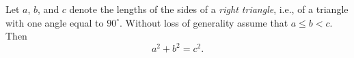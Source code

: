 \documentclass{article}
\begin{document}
\begin{frm-thm}[Pythagoras]
Let $a$, $b$, and $c$ denote the lengths of the sides of a \emph{right 
triangle}, i.e., of a triangle with one angle equal to $90^\circ$. 
Without loss of generality assume that $a\le b<c$. Then
\[ a^2+b^2=c^2. \]
\end{frm-thm}
\end{document}
